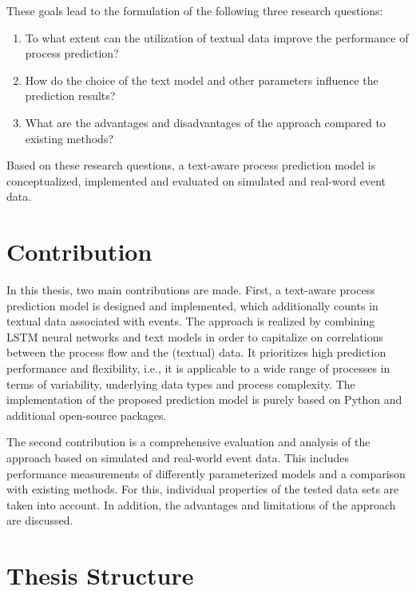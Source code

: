 These goals lead to the formulation of the following three research questions:

\begin{enumerate}
	\item To what extent can the utilization of textual data improve the performance of process prediction?
	\item How do the choice of the text model and other parameters influence the prediction results?
	\item What are the advantages and disadvantages of the approach compared to existing methods?
\end{enumerate}

Based on these research questions, a text-aware process prediction model is conceptualized, implemented and evaluated on simulated and real-word event data.

\section{Contribution}

In this thesis, two main contributions are made.
First, a text-aware process prediction model is designed and implemented, which additionally counts in textual data associated with events.
The approach is realized by combining LSTM neural networks and text models in order to capitalize on correlations between the process flow and the (textual) data.
It prioritizes high prediction performance and flexibility, i.e., it is applicable to a wide range of processes in terms of variability, underlying data types and process complexity.
The implementation of the proposed prediction model is purely based on Python and additional open-source packages.

The second contribution is a comprehensive evaluation and analysis of the approach based on simulated and real-world event data.
This includes performance measurements of differently parameterized models and a comparison with existing methods.
For this, individual properties of the tested data sets are taken into account.
In addition, the advantages and limitations of the approach are discussed.

\section{Thesis Structure}

